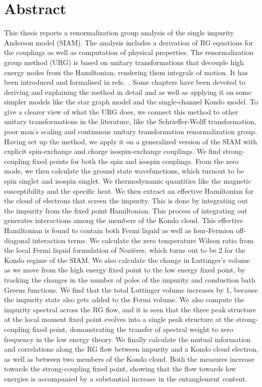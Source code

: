 \chapter*{Abstract}
This thesis reports a renormalization group analysis of the single impurity Anderson model (SIAM). The analysis includes a derivation of RG equations for the couplings as well as computation of physical properties. The renormalization group method (URG) is based on unitary transformations that decouple high energy nodes from the Hamiltonian, rendering them integrals of motion. It has been introduced and formalised in refs.~\cite{anirbanurg1,anirbanurg2,anirbanmott1,anirbanmott2}. Some chapters have been devoted to deriving and explaining the method in detail and as well as applying it on some simpler models like the star graph model and the single-channel Kondo model. To give a clearer view of what the URG does, we connect this method to other unitary transformations in the literature, like the Schrieffer-Wolff transformation, poor man's scaling and continuous unitary transformation renormalization group. Having set up the method, we apply it on a generalized version of the SIAM with explicit spin-exchange and charge isospin-exchange couplings. We find strong-coupling fixed points for both the spin and isospin couplings. From the zero mode, we then calculate the ground state wavefunctions, which turnout to be spin singlet and isospin singlet. We thermodynamic quantities like the magnetic susceptibility and the specific heat. We then extract an effective Hamiltonian for the cloud of electrons that screen the impurity. This is done by integrating out the impurity from the fixed point Hamiltonian. This process of integrating out generates interactions among the members of the Kondo cloud. This effective Hamiltonian is found to contain both Fermi liquid as well as four-Fermion off-diagonal interaction terms. We calculate the zero temperature Wilson ratio from the local Fermi liquid formulation of Nozières, which turns out to be 2 for the Kondo regime of the SIAM. We also calculate the change in Luttinger's volume as we move from the high energy fixed point to the low energy fixed point, by tracking the changes in the number of poles of the impurity and conduction bath Greens functions. We find that the total Luttinger volume increases by 1, because the impurity state also gets added to the Fermi volume. We also compute the impurity spectral across the RG flow, and it is seen that the three peak structure at the local moment fixed point evolves into a single peak structure at the strong-coupling fixed point, demonstrating the transfer of spectral weight to zero frequency in the low energy theory. We finally calculate the mutual information and correlations along the RG flow between impurity and a Kondo cloud electron, as well as between two members of the Kondo cloud. Both the measures increase towards the strong-coupling fixed point, showing that the flow towards low energies is accompanied by a substantial increase in the entanglement content.

\listoffigures
\listoftables
\tableofcontents
